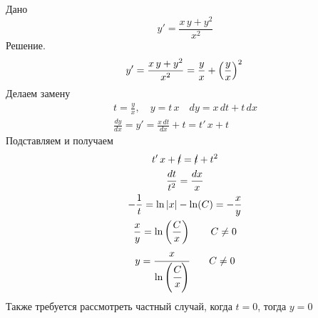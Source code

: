 \begin{Example}
    Дано
    \[
        y' = \frac{x\,y + y^2}{x^2}
    \]
    Решение.
    \[
        y' = \frac{x\,y + y^2}{x^2} = \frac{y}{x} + \left(\frac{y}{x}\right)^2\\
    \]
    Делаем замену
    \begin{gather*}
            t = \frac{y}{x}, \quad y = t\,x \quad dy = x\,dt + t\,dx\\
            \frac{dy}{dx} = y' = \frac{x\,dt}{dx} + t = t'\,x + t
    \end{gather*}
    Подставляем и получаем
    \begin{gather*}    
        t'\,x + \cancel{t} = \cancel{t} + t^2\\
        \frac{dt}{t^2} = \frac{dx}{x}\\
        -\frac{1}{t} = \ln|x| - \ln(C) = - \frac{x}{y}\\
        \frac{x}{y} = \ln\left(\frac{C}{x}\right) \qquad C \neq 0\\
        y = \cfrac{x}{\ln\left(\cfrac{C}{x}\right)} \qquad C \neq 0
    \end{gather*}
    Также требуется рассмотреть частный случай, когда $t = 0$, тогда $y = 0$
\end{Example}


